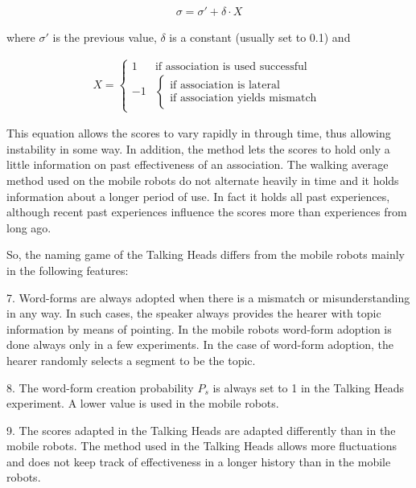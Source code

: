 \begin{eqnarray}
\sigma = \sigma' + \delta \cdot X
\end{eqnarray}


where $\sigma'$ is the previous value, $\delta$ is a constant (usually set to 0.1) and

\begin{eqnarray}
X = \left \{ \begin{array}{rl}
1 & \mbox{if association is used successful}\\
-1 & \left \{\begin{array}{l} \mbox{if association is lateral}\\
	\mbox{if association yields mismatch} \end{array} \right.
\end{array}
\right.
\end{eqnarray}


This equation allows the scores to vary rapidly in through time, thus allowing instability in some way. In addition, the method lets the scores to hold only a little information on past effectiveness of an association. The walking average method used on the mobile robots do not alternate heavily in time and it holds information about a longer period of use. In fact it holds all past experiences, although recent past experiences influence the scores more than experiences from long ago.

So, the naming game of the Talking Heads differs from the mobile robots mainly in the following features:

\begin{description}
\item 7. Word-forms are always adopted when there is a mismatch or misunderstanding in any way. In such cases, the speaker always provides the hearer with topic information by means of pointing. In the mobile robots word-form adoption is done always only in a few experiments. In the case of word-form adoption, the hearer randomly selects a segment to be the topic.
\item 8. The word-form creation probability $P_s$ is always set to 1 in the Talking Heads experiment. A lower value is used in the mobile robots.
\item 9. The scores adapted in the Talking Heads are adapted differently than in the mobile robots. The method used in the Talking Heads allows more fluctuations and does not keep track of effectiveness in a longer history than in the mobile robots.
\end{description}


